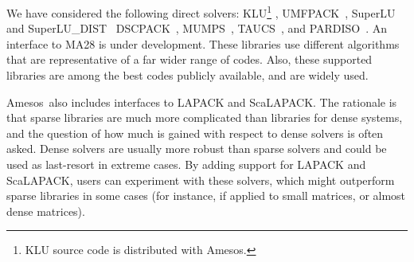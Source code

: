 \documentclass[acmtoms,acmnow]{acmtrans2m}
\newcommand{\amesos}{{\sc Amesos}}
\begin{document}
We have considered the following direct solvers:
  KLU\footnote{KLU source code is
  distributed with \amesos.} \cite{davis05klu},
  UMFPACK~\cite{umfpack-home-page}, SuperLU and
  SuperLU\_DIST~\cite{superlu-manual}
  DSCPACK~\cite{dscpack-manual},
  MUMPS~\cite{mumps-manual},
  TAUCS~\cite{irony04parallel,rotkin04design,rozin04locality},
  and PARDISO~\cite{oskl:04-etna,sg:04-fgcs}. An interface to MA28 is
  under development.
These libraries use different algorithms that are
representative of a far wider range of codes. Also, these supported libraries are
among the best codes publicly available, and are widely used.

\amesos\ also includes interfaces to LAPACK and ScaLAPACK. The rationale is
that
sparse libraries are much more complicated than libraries for dense systems,
  and the question of how much is gained with respect to dense solvers
  is often asked. Dense
  solvers are usually more robust than sparse solvers and could be used as
  last-resort in extreme cases.  By adding support for LAPACK and ScaLAPACK,
  users can experiment with these
  solvers, which might outperform  sparse libraries in some cases
  (for instance, if applied to small matrices, or almost dense matrices).
\end{document}
